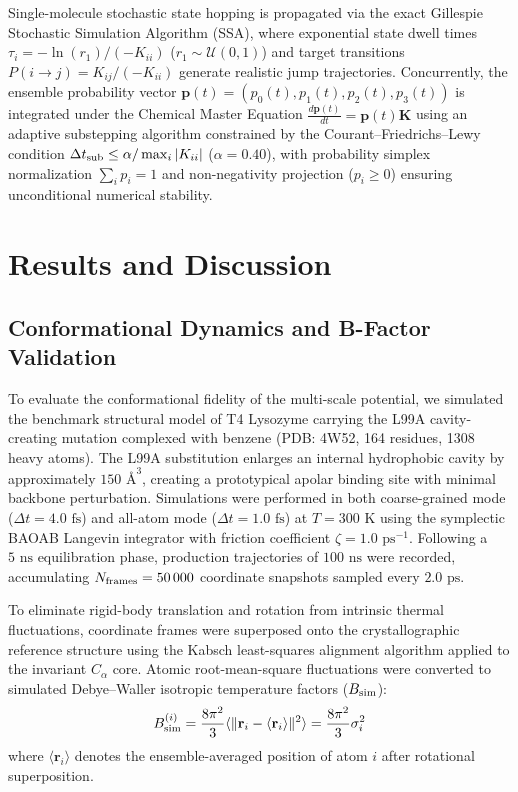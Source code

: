 \documentclass[journal=jpcbfk,manuscript=article,layout=twocolumn]{achemso}
\begin{document}
Single-molecule stochastic state hopping is propagated via the exact Gillespie Stochastic Simulation Algorithm (SSA),\cite{gillespie1977exact} where exponential state dwell times $\tau_i = -\ln(r_1)/(-K_{ii})$ ($r_1 \sim \mathcal{U}(0, 1)$) and target transitions $P(i \to j) = K_{ij}/(-K_{ii})$ generate realistic jump trajectories. Concurrently, the ensemble probability vector $\mathbf{p}(t) = (p_0(t), p_1(t), p_2(t), p_3(t))$ is integrated under the Chemical Master Equation $\frac{d\mathbf{p}(t)}{dt} = \mathbf{p}(t) \mathbf{K}$ using an adaptive substepping algorithm constrained by the Courant--Friedrichs--Lewy condition $\Delta t_{\rm sub} \le \alpha / \max_i |K_{ii}|$ ($\alpha = 0.40$), with probability simplex normalization $\sum_i p_i = 1$ and non-negativity projection ($p_i \ge 0$) ensuring unconditional numerical stability.


\section{Results and Discussion}

\subsection{Conformational Dynamics and B-Factor Validation}
To evaluate the conformational fidelity of the multi-scale potential, we simulated the benchmark structural model of T4 Lysozyme carrying the L99A cavity-creating mutation complexed with benzene (PDB: 4W52, 164 residues, 1308 heavy atoms). The L99A substitution enlarges an internal hydrophobic cavity by approximately $150\text{ \AA}^3$, creating a prototypical apolar binding site with minimal backbone perturbation. Simulations were performed in both coarse-grained mode ($\Delta t = 4.0\text{ fs}$) and all-atom mode ($\Delta t = 1.0\text{ fs}$) at $T = 300\text{ K}$ using the symplectic BAOAB Langevin integrator with friction coefficient $\zeta = 1.0\text{ ps}^{-1}$. Following a $5\text{ ns}$ equilibration phase, production trajectories of $100\text{ ns}$ were recorded, accumulating $N_{\rm frames} = 50\,000$ coordinate snapshots sampled every $2.0\text{ ps}$.

To eliminate rigid-body translation and rotation from intrinsic thermal fluctuations, coordinate frames were superposed onto the crystallographic reference structure using the Kabsch least-squares alignment algorithm applied to the invariant $C_\alpha$ core. Atomic root-mean-square fluctuations were converted to simulated Debye--Waller isotropic temperature factors ($B_{\rm sim}$):
\begin{equation}
B_{\rm sim}^{(i)} = \frac{8\pi^2}{3} \langle \|\mathbf{r}_i - \langle \mathbf{r}_i \rangle\|^2 \rangle = \frac{8\pi^2}{3} \sigma_i^2
\end{equation}
where $\langle \mathbf{r}_i \rangle$ denotes the ensemble-averaged position of atom $i$ after rotational superposition.
\end{document}
